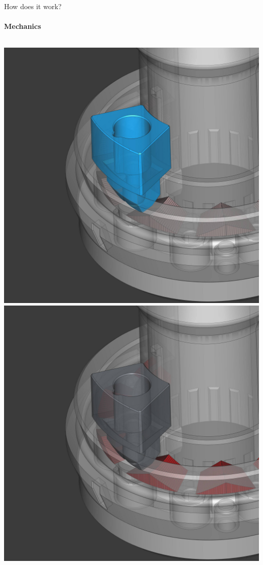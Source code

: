 \documentclass[
    english,
    accentcolor=9c,
    design=2023,
    logofile=images/hulogo.pdf,
]{tudabeamer}
\begin{document}
\begin{frame}{How does it work?}
    \framesubtitle{Mechanics}
    \begin{columns}[onlytextwidth,c]
        \centering
        \includegraphics[height=0.7\linewidth]{../images/cad_rotator_head.jpg}
        \centering
        \includegraphics[height=0.7\linewidth]{../images/cad_ramped_track.jpg}
    \end{columns}
\end{frame}
\end{document}
